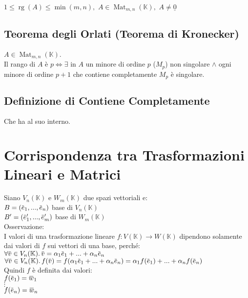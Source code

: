 \documentclass[a4paper, twoside, italian, 11pt]{book}
\newcommand{\overbar}[1] {\mkern 1.5mu\overline{\mkern-1.5mu#1\mkern-1.5mu}\mkern 1.5mu}
\DeclareMathOperator{\Mat}{Mat}
\DeclareMathOperator{\rg}{rg}
\newcommand{\K}{\mathbb K}
\begin{document}
\noindent
$1 \leq \rg(A) \leq \min(m,n),$ $A \in \Mat_{m,n}(\K),$ $A \neq \underline{0}$


\subsection{Teorema degli Orlati (Teorema di Kronecker)}

$A \in \Mat_{m,n}(\K)$.\\
Il rango di $A$ è $p \iff \exists$ in $A$ un minore di ordine $p$ ($M_p$) non singolare $\land$ ogni minore di ordine $p + 1$ che contiene completamente $M_p$ è singolare.


\subsection{Definizione di Contiene Completamente}
Che ha al suo interno.



\section{Corrispondenza tra Trasformazioni Lineari e Matrici}

Siano $V_n(\K)$ e $W_m(\K)$ due spazi vettoriali e: \\

$B = (\overbar e_1, ..., \overbar e_n)$ base di $V_n(\K)$ \\
\indent
$B' = (\overbar e'_1, ..., \overbar e'_m)$ base di $W_m(\K)$ \\

\noindent
Osservazione: \\
I valori di una trasformazione lineare $f : V(\K) \rightarrow W(\K)$ dipendono solamente dai valori di $f$ sui vettori di una base, perché: \\

$\forall \overbar v \in V_n(\K) \ldotp \overbar v = \alpha_1 \overbar e_1 + ... + \alpha_n \overbar e_n$ \\

$\forall \overbar v \in V_n(\K) \ldotp f(\overbar v) = f(\alpha_1 \overbar e_1 + ... + \alpha_n \overbar e_n) = \alpha_1 f(\overbar e_1) + ... + \alpha_n f(\overbar e_n)$ \\

\noindent
Quindi $f$ è definita dai valori: \\

$f(\overbar e_1) = \overbar w_1$ \\
\indent
$\vdots$ \\
\indent
$f(\overbar e_n) = \overbar w_n$ \\
\end{document}
